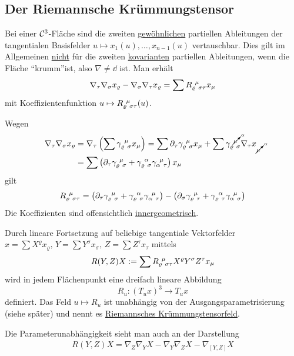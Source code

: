 \subsection{Der Riemannsche Krümmungstensor}
Bei einer \(\mathcal{C}^3\)-Fläche sind die zweiten \uline{gewöhnlichen} partiellen Ableitungen der tangentialen Basisfelder \(u \mapsto x_1(u), \dots, x_{n-1} (u)\) vertauschbar. Dies gilt im Allgemeinen \uline{nicht} für die zweiten \uline{kovarianten} partiellen Ableitungen, wenn die Fläche ``krumm''ist, also \(\nabla \ne \dd\) ist. Man erhält
\begin{align*}
 \nabla_\tau \nabla_\sigma x_\varrho - \nabla_\sigma \nabla_\tau x_\varrho = \sum R_{\varrho \;\, \sigma \tau}^{\;\, \mu} x_\mu
\end{align*}
mit Koeffizientenfunktion \(u \mapsto R_{\varrho \;\, \sigma \tau}^{\;\, \mu} (u)\). \par
Wegen
\begin{align*}
 \nabla_{\tau} \nabla_\sigma x_\varrho &= \nabla_\tau \left( \sum \gamma_{\varrho \;\, \sigma}^{\;\, \mu} x_\mu \right) = \sum \partial_\tau \gamma_{\varrho \;\, \sigma}^{\;\, \mu} x_\mu + \sum \gamma_{\varrho \;\, \sigma}^{\;\, \cancelto{\alpha}{\mu}} \nabla_\tau x_{\cancelto{\alpha}{\mu}} \\
 &=\sum \left(\partial_\tau \gamma_{\varrho \;\, \sigma}^{\;\, \mu} + \gamma_{\varrho \;\, \sigma}^{\;\, \alpha} \gamma_{\alpha \;\, \tau}^{\;\, \mu} \right) x_\mu
\end{align*}
gilt
\[
 R_{\varrho \;\, \sigma \tau}^{\;\, \mu} = \left(\partial_\tau \gamma_{\varrho \;\, \sigma}^{\;\, \mu} + \gamma_{\varrho \;\, \sigma}^{\;\, \alpha} \gamma_{\alpha \;\, \tau}^{\;\, \mu} \right) - \left(\partial_\sigma \gamma_{\varrho \;\, \tau}^{\;\, \mu} + \gamma_{\varrho \;\, \tau}^{\;\, \alpha} \gamma_{\alpha \;\, \sigma}^{\;\, \mu} \right)
\]
Die Koeffizienten sind offensichtlich \uline{innergeometrisch}. \par
Durch lineare Fortsetzung auf beliebige tangentiale Vektorfelder \(x = \sum X^\varrho x_\varrho, \, Y = \sum Y^\sigma x_\sigma, \, Z = \sum Z^\tau x_\tau\) mittels
\begin{align*}
 R(Y,Z)X := \sum R_{\varrho \;\, \sigma \tau}^{\;\, \mu} X^\varrho Y^\sigma Z^\tau x_\mu
\end{align*}
wird in jedem Flächenpunkt eine dreifach lineare Abbildung 
\[
 R_u \colon (T_u x)^3 \to T_u x
\]
definiert. Das Feld \(u \mapsto R_u\) ist unabhängig von der Ausgangsparametrisierung (siehe später) und nennt es \uline{Riemannsches Krümmungstensorfeld}.

\begin{bemerkung}
 Die Parameterunabhängigkeit sieht man auch an der Darstellung
 \begin{align*}
  R(Y,Z)X = \nabla_Z \nabla_Y X - \nabla_Y \nabla_Z X - \nabla_{[Y,Z]} X
 \end{align*}

\end{bemerkung}

